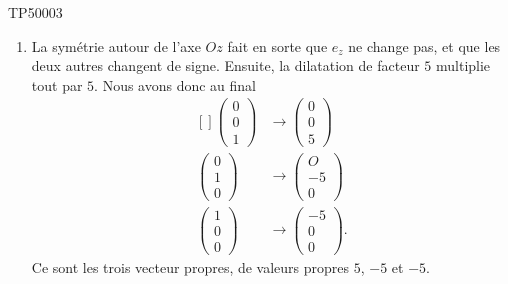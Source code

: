 \begin{corrige}{TP50003}
\begin{enumerate}
		\item
			La symétrie autour de l'axe $Oz$ fait en sorte que $e_z$ ne change pas, et que les deux autres changent de signe. Ensuite, la dilatation de facteur $5$ multiplie tout par $5$. Nous avons donc au final
			\begin{equation}
				\begin{aligned}[]
					\begin{pmatrix}
						0	\\ 
						0	\\ 
						1	
					\end{pmatrix}&\to\begin{pmatrix}
						0	\\ 
						0	\\ 
						5	
					\end{pmatrix}\\
					\begin{pmatrix}
						0	\\ 
						1	\\ 
						0	
					\end{pmatrix}&\to
					\begin{pmatrix}
						O	\\ 
						-5	\\ 
						0	
					\end{pmatrix}\\
					\begin{pmatrix}
						1	\\ 
						0	\\ 
						0	
					\end{pmatrix}&\to\begin{pmatrix}
						-5	\\ 
						0	\\ 
						0	
					\end{pmatrix}.
				\end{aligned}
			\end{equation}
			Ce sont les trois vecteur propres, de valeurs propres $5$, $-5$ et $-5$.

	\end{enumerate}
	

\end{corrige}
